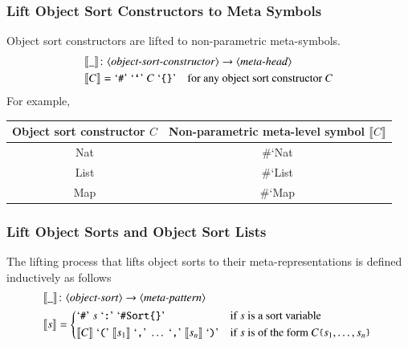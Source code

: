 \documentclass[UTF8,11pt]{article}
\theoremstyle{plain}
\theoremstyle{definition}
\theoremstyle{remark}
\newcommand{\parametric}[2]{{#1}\raisebox{.2ex}{\texttt{\footnotesize{\{}}}#2\raisebox{.2ex}{\texttt{\footnotesize{\}}}}}
\newcommand{\denote}[1]{\llbracket{#1}\rrbracket}
\newcommand{\sharpsymbol}{\#}
\newcommand{\KSort}{\texttt{\sharpsymbol Sort}}
\newcommand{\quottt}[1]{\textrm{\lq\texttt{#1}\rq}}
\newcommand{\syntacc}[1]{\text{$\langle$\textit{#1}$\rangle$}}
\begin{document}
%
\subsubsection{Lift Object Sort Constructors to Meta Symbols}
Object sort constructors are lifted to non-parametric meta-symbols.
\begin{align*}
& \denote{\_} \colon \syntacc{object-sort-constructor} \to \syntacc{meta-head}
\\
& \denote{C} = \quottt{\sharpsymbol} \ \quottt{`} \ C \ \quottt{\{\}}
\quad
\text{for any object sort constructor $C$}
\end{align*}
For example,
\begin{center}{\ttfamily
\begin{tabular}{c|c}
    \textrm{Object sort constructor $C$} &
    \textrm{Non-parametric meta-level symbol $\denote{C}$}
    \\\hline
    Nat & \parametric{\sharpsymbol `Nat}{}
    \\\hline
    List & \parametric{\sharpsymbol `List}{}
    \\\hline
    Map & \parametric{\sharpsymbol `Map}{}
\end{tabular}
}
\end{center}

\subsubsection{Lift Object Sorts and Object Sort Lists}
The lifting process that lifts object sorts to their meta-representations
is defined inductively as follows
\begin{align*}
&\denote{\_} \colon \syntacc{object-sort} \to \syntacc{meta-pattern} \\
&\denote{s} = \begin{cases*}
\quottt{\sharpsymbol} \ s \ \quottt{:} \ \quottt{\KSort\{\}} & if $s$ is a
sort variable \\
\denote{C} \ \quottt{(} \
\denote{s_1} \ \quottt{,} \
\dots \ \quottt{,} \
\denote{s_n} \ \quottt{)} & if $s$
is of the
form $\parametric{C}{s_1,\dots,s_n}$
\end{cases*}
\end{align*}
\end{document}
